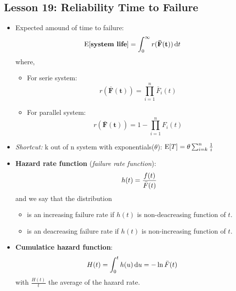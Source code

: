 \documentclass[10pt, french]{article}
\begin{document}
\begin{multicols*}{3}
\section*{Lesson 19: Reliability Time to Failure}
\begin{itemize}[align=left,leftmargin=*]
    \item Expected amound of time to failure: \[ \mathrm{E} {\left[ \textbf{system life} \right]} = \int_0^\infty r(\mathbf{\bar{F}(t)}) \mathop{}\!\mathrm{d}{t} \]
    where,
    \begin{itemize}
        \item For serie system: \[ r(\mathbf{\bar{F}(t)}) = \prod_{i=1}^n \bar{F}_i(t) \]
        \item For parallel system: \[ r(\mathbf{\bar{F}(t)}) = 1 - \prod_{i=1}^n F_i(t) \]
    \end{itemize}
    \item \emph{Shortcut:} k out of n system with exponentials($\theta$): $\mathrm{E} {\left[ T \right]}=\theta \sum_{i=k}^n \frac{1}{i}$ 
    \item \textbf{Hazard rate function} (\emph{failure rate function}): \[ \hspace{.7cm} h(t) = \frac{f(t)}{\bar{F}(t)} \]
    and we say that the distribution
    \begin{itemize}
        \item is an increasing failure rate if $h(t)$ is non-deacreasing function of $t$.
        \item is an deacreasing failure rate if $h(t)$ is non-increasing function of $t$. 
    \end{itemize}
    \item \textbf{Cumulatice hazard function}: \[ H(t) = \int_0^t h(u) \mathop{}\!\mathrm{d}{u}= -\ln \bar{F}(t)  \] with $\frac{H(t)}{t}$ the average of the hazard rate.
\end{itemize}

\def\SectionColor{purple!80!white}

\end{multicols*}
\end{document}
